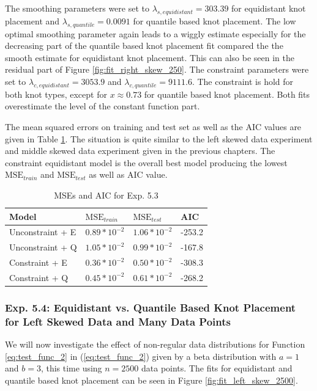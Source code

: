 \documentclass[10pt,a4paper]{article}
\begin{document}
The smoothing parameters were set to $\lambda_{s, equidistant} = 303.39$ for equidistant knot placement and $\lambda_{s, quantile} = 0.0091$ for quantile based knot placement. The low optimal smoothing parameter again leads to a wiggly estimate  especially for the decreasing part of the quantile based knot placement fit compared the the smooth estimate for equidistant knot placement. This can also be seen in the residual part of Figure \ref{fig:fit_right_skew_250}. The constraint parameters were set to $\lambda_{c, equidistant} = 3053.9$ and $\lambda_{c, quantile} = 9111.6$. The constraint is hold for both knot types, except for $x \approx 0.73$ for quantile based knot placement. Both fits overestimate the level of the constant function part.

The mean squared errors on training and test set as well as the AIC values are given in Table \ref{tab:metrics_53}. The situation is quite similar to the left skewed data experiment and middle skewed data experiment given in the previous chapters. The constraint equidistant model is the overall best model producing the lowest $\text{MSE}_{train}$ and $\text{MSE}_{test}$ as well as AIC value.

\begin{table}[H]
	\centering
	\begin{tabular}{|l|l|l|l|}
		\hline
		\textbf{Model} & \textbf{$\text{MSE}_{train}$} & \textbf{$\text{MSE}_{test}$}  & \textbf{AIC} \\ \hline \toprule
		Unconstraint + E  & $0.89 * 10^{-2}$  & $1.06 * 10^{-2}$ & -253.2       \\ \hline
		Unconstraint + Q  & $1.05 * 10^{-2}$  & $0.99 * 10^{-2}$ & -167.8       \\ \hline
		Constraint + E    & $0.36 * 10^{-2}$  & $0.50 * 10^{-2}$ & -308.3       \\ \hline
		Constraint + Q    & $0.45 * 10^{-2}$  & $0.61 * 10^{-2}$ & -268.2      \\ \hline \bottomrule
	\end{tabular}
	\caption{MSEs and AIC for Exp. 5.3}
	\label{tab:metrics_53}
\end{table}


\subsubsection{Exp. 5.4: Equidistant vs. Quantile Based Knot Placement for Left Skewed Data and Many Data Points}

We will now investigate the effect of non-regular data distributions for Function \ref{eq:test_func_2} in (\ref{eq:test_func_2}) given by a beta distribution with $a = 1$ and $b = 3$, this time using $n=2500$ data points. The fits for equidistant and quantile based knot placement can be seen in Figure \ref{fig:fit_left_skew_2500}. 
\end{document}
